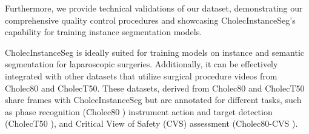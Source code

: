 Furthermore, we provide technical validations of our dataset, demonstrating our comprehensive quality control procedures and showcasing CholecInstanceSeg's capability for training instance segmentation models.

CholecInstanceSeg is ideally suited for training models on instance and semantic segmentation for laparoscopic surgeries. Additionally, it can be effectively integrated with other datasets that utilize surgical procedure videos from Cholec80 and CholecT50. These datasets, derived from Cholec80 and CholecT50 share frames with CholecInstanceSeg but are annotated for different tasks, such as phase recognition (Cholec80 \cite{endonet_cis}) instrument action and target detection (CholecT50 \cite{NWOYE2022102433_rendevous_cis}), and Critical View of Safety (CVS) assessment (Cholec80-CVS \cite{rios2023cholec80}).





